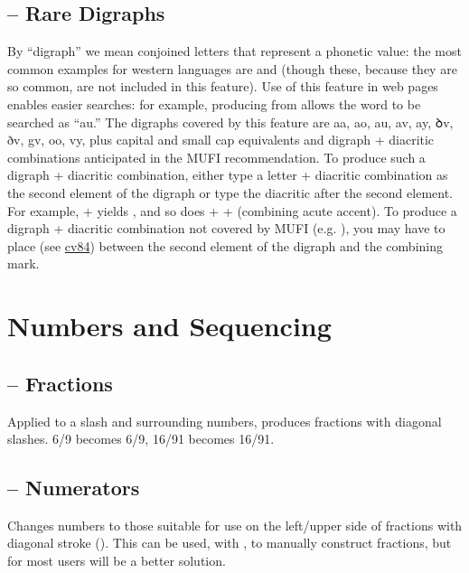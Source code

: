 \subsection{ – Rare
Digraphs}\hypertarget{ss17}{}
By “digraph” we mean conjoined letters that represent a phonetic value: the most common examples
for western languages are \textex{{\ae}} and \textex{{\oe}} (though these, because they
are so common, are not included in this feature). Use of this feature in web pages enables easier searches: for
example, producing  from
 allows the word to be
searched as “{\th}au.” The digraphs covered by this feature are \textcolor[rgb]{0.5529412,0.15686275,0.11764706}{%
aa, ao, au, av, ay, ꝺv, ðv, gv, oo, vy,} plus capital and small cap
equivalents and digraph +
diacritic combinations anticipated in the
MUFI recommendation. To produce such a digraph + diacritic combination, either type a letter + diacritic combination as
the second element of the digraph or type the diacritic after the second element. For example,
 +  yields , and so does
 +  +  (combining acute accent). To produce a digraph +
diacritic combination not covered by MUFI (e.g. ), you may have to place 
 (see \hyperlink{cv84}{cv84}) between the second element of the digraph and the combining mark.

\section{Numbers and Sequencing}
\subsection{ – Fractions}
Applied to a slash and surrounding numbers, produces fractions with diagonal
slashes. 6/9 becomes {6/9}, 16/91 becomes {16/91}.

\subsection{ – Numerators}
Changes numbers to those suitable for use on the left/upper side of fractions
with diagonal stroke (). This can be used, with , to manually construct
fractions, but for most users  will be a better solution.

